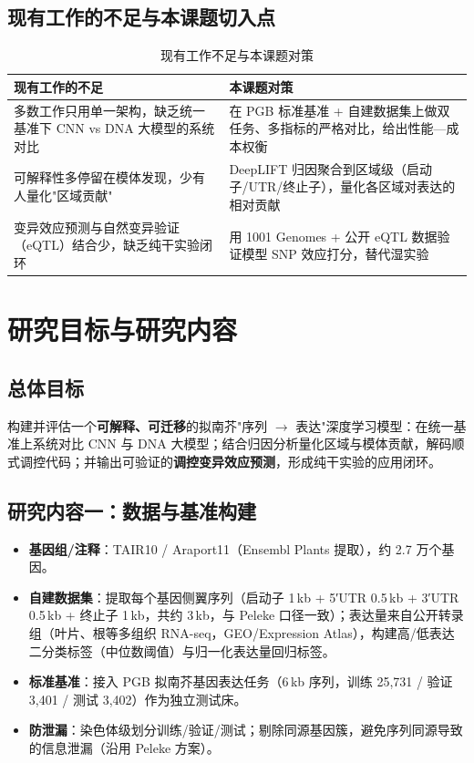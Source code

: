 \documentclass[UTF8,11pt,a4paper]{ctexart}
\begin{document}
\subsection{现有工作的不足与本课题切入点}
\label{sec:survey-gap}

\begin{table}[htbp]
\centering
\caption{现有工作不足与本课题对策}
\label{tab:gap}
\small
\begin{tabular}{@{}p{8.0cm}p{6.2cm}@{}}
\toprule
\textbf{现有工作的不足} & \textbf{本课题对策} \\
\midrule
多数工作只用单一架构，缺乏统一基准下 CNN vs DNA 大模型的系统对比 & 在 PGB 标准基准 + 自建数据集上做双任务、多指标的严格对比，给出性能—成本权衡 \\
可解释性多停留在模体发现，少有人量化"区域贡献" & DeepLIFT 归因聚合到区域级（启动子/UTR/终止子），量化各区域对表达的相对贡献 \\
变异效应预测与自然变异验证（eQTL）结合少，缺乏纯干实验闭环 & 用 1001 Genomes + 公开 eQTL 数据验证模型 SNP 效应打分，替代湿实验 \\
\bottomrule
\end{tabular}
\end{table}

\section{研究目标与研究内容}
\label{sec:objective}

\subsection{总体目标}
\label{sec:objective-overall}

构建并评估一个\textbf{可解释、可迁移}的拟南芥"序列 $\rightarrow$ 表达"深度学习模型：在统一基准上系统对比 CNN 与 DNA 大模型；结合归因分析量化区域与模体贡献，解码顺式调控代码；并输出可验证的\textbf{调控变异效应预测}，形成纯干实验的应用闭环。

\subsection{研究内容一：数据与基准构建}
\label{sec:obj-data}

\begin{itemize}
\item \textbf{基因组/注释}：TAIR10 / Araport11（Ensembl Plants 提取），约 2.7 万个基因。
\item \textbf{自建数据集}：提取每个基因侧翼序列（启动子 1\,kb + 5′UTR 0.5\,kb + 3′UTR 0.5\,kb + 终止子 1\,kb，共约 3\,kb，与 Peleke 口径一致）；表达量来自公开转录组（叶片、根等多组织 RNA-seq，GEO/Expression Atlas），构建高/低表达二分类标签（中位数阈值）与归一化表达量回归标签。
\item \textbf{标准基准}：接入 PGB 拟南芥基因表达任务（6\,kb 序列，训练 25,731 / 验证 3,401 / 测试 3,402）作为独立测试床\cite{pgb2024}。
\item \textbf{防泄漏}：染色体级划分训练/验证/测试；剔除同源基因簇，避免序列同源导致的信息泄漏（沿用 Peleke 方案）\cite{peleke2024}。
\end{itemize}
\end{document}
